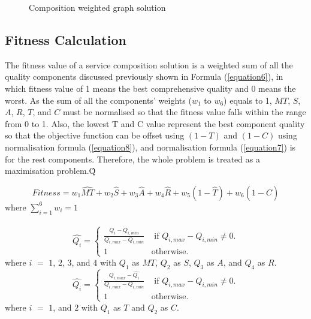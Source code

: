 \documentclass{llncs}
\begin{document}
\begin{figure}[h]
\centerline{
}
 \caption{Composition weighted graph solution}
 \label{wscs}
\end{figure}

\subsection{Fitness Calculation}
The fitness value of a service composition solution is a weighted sum of all the quality components discussed previously shown in Formula (\ref{equation6}), in which fitness value of 1 means the best comprehensive quality and 0 means the worst. As the sum of all the components' weights ($w_1$ to $w_6$) equals to 1, $MT$, $S$, $A$, $R$, $T$, and $C$ must be normalised so that the fitness value falls within the range from 0 to 1. Also, the lowest T and C value represent the best component quality so that the objective function can be offset using $(1 - T)$ and $(1 - C)$ using normalisation formula (\ref{equation8}), and normalisation formula (\ref{equation7}) is for the rest components. Therefore, the whole problem is treated as a maximisation problem.\^{Q}


\begin{equation}
\label{equation6}
Fitness = w_1 \hat{MT} + w_2 \hat{S} + w_3 \hat{A} + w_4 \hat{R} + w_5(1 - \hat{T}) + w_6(1 - \hat{C})
\end{equation}
\noindent where $\sum_{i=1}^{6} w_i = 1$
\\\\
\begin{equation}
\label{equation7}
\hat{Q_i} = 
\begin{cases}
	\frac{Q_i - Q_{i, min}}{Q_{i, max} - Q_{i, min}} & \text{ if }Q_{i, max} - Q_{i, min} \neq 0.\\
	1 & \mathrm{ otherwise}.
\end{cases}
\end{equation}
\noindent where $i$ $=$ $1$, $2$, $3$, and $4$ with $Q_1$ as $MT$, $Q_2$ as $S$, $Q_3$ as $A$, and $Q_4$ as $R$.
\begin{equation}
\label{equation8}
\hat{Q_i} = 
\begin{cases}
	\frac{Q_{i,max} - \hat{Q_i}}{Q_{i, max} - Q_{i, min}} & \text{ if }Q_{i, max} - Q_{i, min} \neq 0.\\
	1 & \mathrm{ otherwise}.
\end{cases}
\end{equation}
\noindent where $i$ $=$ $1$, and $2$ with $Q_1$ as $T$ and $Q_2$ as $C$.
\end{document}
